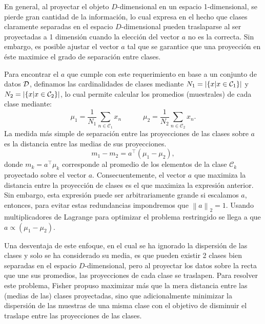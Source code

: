 En general, al proyectar el objeto $D$-dimensional en un espacio  1-dimensional, se pierde gran cantidad de la información, lo cual expresa en el hecho que clases claramente separadas en el espacio $D$-dimensional pueden traslaparse al ser proyectadas a 1 dimensión cuando la elección del vector $a$ no es la correcta. Sin embargo, es posible ajustar el vector $a$ tal que se  garantice que una proyección en éste maximice el grado de separación entre clases.

Para encontrar el $a$ que cumple con este requerimiento en base a un conjunto de datos  ${\mathcal D}$, definamos las cardinalidades de clases mediante $N_1 = |\{x|x\in{\mathcal C}_1\}|$ y $N_2 = |\{x|x\in{\mathcal C}_2\}|$, lo cual permite calcular los promedios (muestrales) de cada  clase mediante: 
\begin{equation}
	\mu_1=\frac{1}{N_1}\sum_{n\in\mathcal{C}_1}x_n
	\quad\quad\quad
	\mu_2=\frac{1}{N_2}\sum_{n\in\mathcal{C}_2}x_n.
\end{equation}
La medida más simple de separación entre las proyecciones de las clases sobre $a$ es la distancia entre las medias  de sus proyecciones.
\begin{equation}
	m_1 - m_2 = a^\top(\mu_1-\mu_2),
\end{equation}
donde $m_k= a^\top\mu_k$ corresponde al promedio de los elementos de  la clase $\mathcal{C}_k$ proyectado sobre el  vector $a$. Consecuentemente, el vector $a$ que maximiza la distancia entre la proyección de clases es el que maximiza la expresión anterior. Sin embargo, esta expresión puede ser arbitrariamente grande si escalamos $a$, entonces, para evitar estas redundancias impondremos que $\left \| a \right \|_2=1$. Usando multiplicadores de Lagrange para optimizar el problema restringido se llega a que $a\propto(\mu_1-\mu_2)$. 

Una desventaja de este enfoque, en el cual se ha ignorado la dispersión de las clases y solo se ha considerado su media, es que pueden existir 2 clases bien separadas en el espacio $D$-dimensional, pero al proyectar los datos sobre la recta que une sus promedios, las proyecciones de cada clase se traslapen. Para resolver este problema, Fisher propuso maximizar más que la mera distancia entre las (medias de las) clases proyectadas, sino que adicionalmente minimizar la dispersión de las  muestras de una misma clase con el objetivo de disminuir el traslape entre las proyecciones de las clases. 

